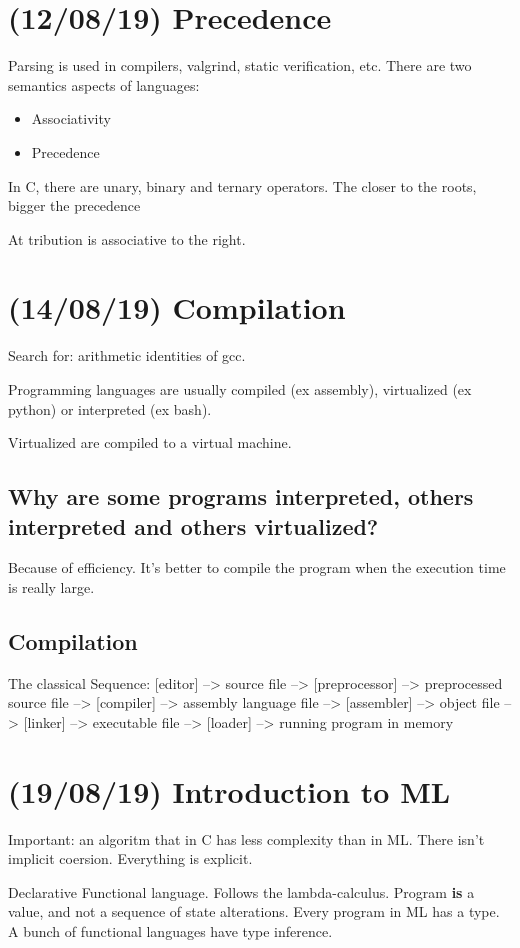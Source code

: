 \documentclass[11pt]{article}
\begin{document}
\section{(12/08/19) Precedence}
\label{sec:org65eb017}
Parsing is used in compilers, valgrind, static verification, etc.
There are two semantics aspects of languages:
\begin{itemize}
\item Associativity
\item Precedence
\end{itemize}

In C, there are unary, binary and ternary operators. The closer to the roots, bigger the precedence

At  tribution is associative to the right.
\section{(14/08/19) Compilation}
\label{sec:orgba61e34}
Search for: arithmetic identities of gcc.

Programming languages are usually compiled (ex assembly), virtualized (ex python) or
interpreted (ex bash).

Virtualized are compiled to a virtual machine.

\subsection{Why are some programs interpreted, others interpreted and others virtualized?}
\label{sec:org4d38a39}
Because of efficiency. It's better to compile the program when the execution time is
really large.
\subsection{Compilation}
\label{sec:org911fb04}
The classical Sequence:
[editor] --> source file --> [preprocessor] --> preprocessed source file
--> [compiler] --> assembly language file --> [assembler] -->
object file --> [linker] --> executable file -->
[loader] --> running program in memory

\section{(19/08/19) Introduction to ML}
\label{sec:org0c99a99}
Important: an algoritm that in C has less complexity than in ML.
There isn't implicit coersion. Everything is explicit.

Declarative Functional language. Follows the lambda-calculus. Program \textbf{is} a value, and
not a sequence of state alterations. Every program in ML has a type. A bunch of
functional languages have type inference.
\end{document}
